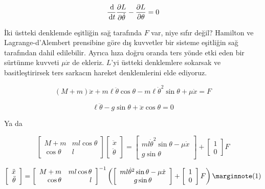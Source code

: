 \documentclass[12pt,fleqn]{article}\usepackage{../../common}
\begin{document}
$$
\frac{\,\mathrm{d}}{\,\mathrm{d} t} \frac{\partial L}{\partial \dot{\theta}} -
\frac{\partial L}{\partial \theta}  = 0
$$

İki üstteki denklemde eşitliğin sağ tarafında $F$ var, niye sıfır değil?
Hamilton ve Lagrange-d'Alembert prensibine göre dış kuvvetler bir sisteme
eşitliğin sağ tarafından dahil edilebilir. Ayrıca hıza doğru oranda ters
yönde etki eden bir sürtünme kuvveti $\mu\dot{x}$ de ekleriz. $L$'yi
üstteki denklemlere sokarsak ve basitleştirirsek ters sarkacın hareket
denklemlerini elde ediyoruz.

$$
(M+m) \ddot{x} + 
m \ell \ddot{\theta} \cos\theta - 
m \ell \dot{\theta}^2 \sin\theta + \mu\dot{x} = F
$$

$$
\ell \ddot{\theta} - g \sin\theta + \ddot{x} \cos\theta = 0
$$

Ya da

$$
\left[\begin{array}{rr}
M+m & m l \cos\theta \\ \cos\theta & l
\end{array}\right]
\left[\begin{array}{r}
\ddot{x} \\ \ddot{\theta}
\end{array}\right] 
=
\left[\begin{array}{c}
m l \dot{\theta}^2 \sin\theta - \mu \dot{x} \\
g \sin\theta
\end{array}\right] + 
\left[\begin{array}{r}
1 \\ 0
\end{array}\right] F 
$$

$$
\left[\begin{array}{r}
\ddot{x} \\ \ddot{\theta}
\end{array}\right] 
=
\left[\begin{array}{rr}
M+m & m l \cos\theta \\ \cos\theta & l
\end{array}\right]^{-1}
\left(
  \left[\begin{array}{c}
  m l \dot{\theta}^2 \sin\theta - \mu \dot{x} \\
  g \sin\theta
  \end{array}\right] + 
  \left[\begin{array}{r}
  1 \\ 0
  \end{array}\right] F
\right)
\mlabel{1}
$$
\end{document}

